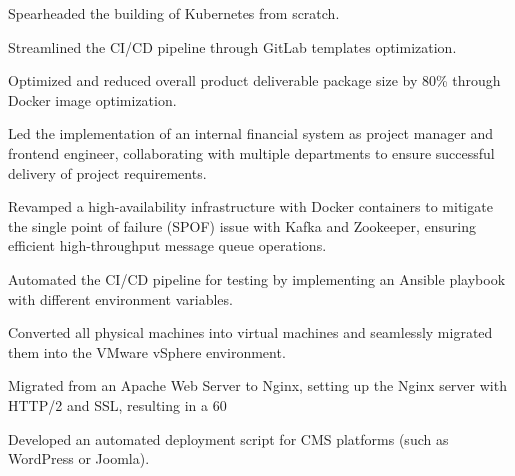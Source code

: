 \documentclass[]{deedy-resume-openfont}
\begin{document}
\begin{minipage}[t]{1\textwidth}
\null\hfill{}
\begin{tightemize}
    \item Spearheaded the building of Kubernetes from scratch.
    \item Streamlined the CI/CD pipeline through GitLab templates optimization.
    \item Optimized and reduced overall product deliverable package size by 80\% through Docker image optimization.
    \item Led the implementation of an internal financial system as project manager and frontend engineer, collaborating with multiple departments to ensure successful delivery of project requirements.
\end{tightemize}
\sectionsep

\null\hfill{}
\begin{tightemize}
    \item Revamped a high-availability infrastructure with Docker containers to mitigate the single point of failure (SPOF) issue with Kafka and Zookeeper, ensuring efficient high-throughput message queue operations.
    \item Automated the CI/CD pipeline for testing by implementing an Ansible playbook with different environment variables.
\end{tightemize}
\sectionsep

\null\hfill{}
\begin{tightemize}
    \item Converted all physical machines into virtual machines and seamlessly migrated them into the VMware vSphere environment.
    \item Migrated from an Apache Web Server to Nginx, setting up the Nginx server with HTTP/2 and SSL, resulting in a 60%
    \item Developed an automated deployment script for CMS platforms (such as WordPress or Joomla).
\end{tightemize}



\end{minipage}
%
%
\end{document}
